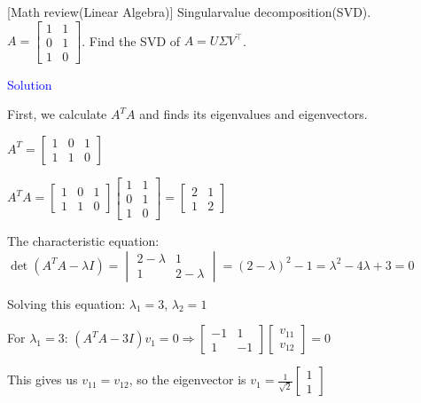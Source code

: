\item {} [Math review(Linear Algebra)] Singularvalue decomposition(SVD). \\
$A=\left[\begin{array}{ll}1 & 1 \\ 0 & 1 \\ 1 & 0\end{array}\right]$. Find the SVD of $A=U \Sigma V^{\top}$.

\textcolor{blue}{Solution}

First, we  calculate $A^TA$ and finds its eigenvalues and eigenvectors.

$A^T = \begin{bmatrix} 1 & 0 & 1 \\ 1 & 1 & 0 \end{bmatrix}$

$A^TA = \begin{bmatrix} 1 & 0 & 1 \\ 1 & 1 & 0 \end{bmatrix} \begin{bmatrix} 1 & 1 \\ 0 & 1 \\ 1 & 0 \end{bmatrix} = \begin{bmatrix} 2 & 1 \\ 1 & 2 \end{bmatrix}$

The characteristic equation: $\det(A^TA - \lambda I) = \begin{vmatrix} 2-\lambda & 1 \\ 1 & 2-\lambda \end{vmatrix} = (2-\lambda)^2 - 1 = \lambda^2 - 4\lambda + 3 = 0$

Solving this equation: $\lambda_1 = 3$, $\lambda_2 = 1$

For $\lambda_1 = 3$:
$(A^TA - 3I)v_1 = 0 \Rightarrow \begin{bmatrix} -1 & 1 \\ 1 & -1 \end{bmatrix} \begin{bmatrix} v_{11} \\ v_{12} \end{bmatrix} = 0$

This gives us $v_{11} = v_{12}$, so the eigenvector is $v_1 = \frac{1}{\sqrt{2}}\begin{bmatrix} 1 \\ 1 \end{bmatrix}$

